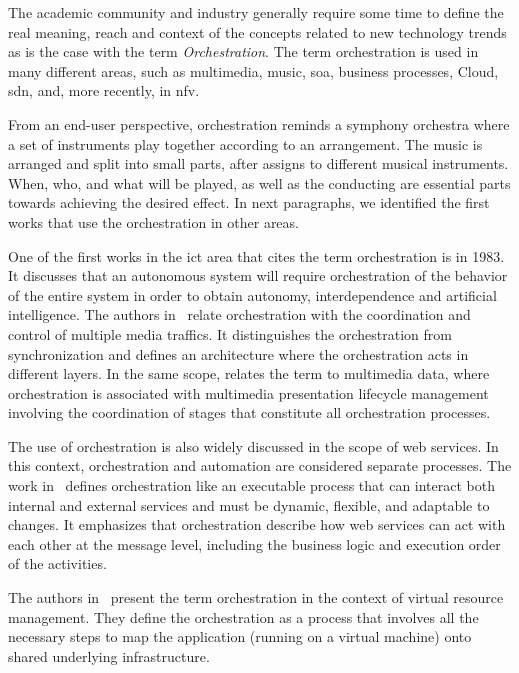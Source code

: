 The academic community and industry generally require some time to define the real meaning, reach and context of the concepts related to new technology trends as is the case with the term \textit{Orchestration}. 
The term orchestration is used in many different areas, such as multimedia, music, \gls{soa}, business processes, Cloud, \gls{sdn}, and, more recently, in \gls{nfv}.

From an end-user perspective, orchestration reminds a symphony orchestra where a set of instruments play together according to an arrangement. The music is arranged and split into small parts, after assigns to different musical instruments. When, who, and what will be played, as well as the conducting are essential parts towards achieving the desired effect. In next paragraphs, we identified the first works that use the orchestration in other areas. 

One of the first works in the \gls{ict} area that cites the term orchestration is \cite{Anderson1983} in 1983. It discusses that an autonomous system will require orchestration of the behavior of the entire system in order to obtain autonomy, interdependence and artificial intelligence. The authors in~\cite{Campbell1992} relate orchestration with the coordination and control of multiple media traffics. It distinguishes the orchestration from synchronization and defines an architecture where the orchestration acts in different layers. In the same scope, \cite{Robbins1997ImplementationArchitecture} relates the term to multimedia data, where orchestration is associated with multimedia presentation lifecycle management involving the coordination of stages that constitute all orchestration processes. 

The use of orchestration is also widely discussed in the scope of web services. In this context, orchestration and automation are considered separate processes. The work in~\cite{Peltz2003WebChoreography} defines orchestration like an executable process that can interact both internal and external services and must be dynamic, flexible, and adaptable to changes. It emphasizes that orchestration describe how web services can act with each other at the message level, including the business logic and execution order of the activities. 

The authors in~\cite{Grit2006} present the term orchestration in the context of virtual resource management. They define the orchestration as a process that involves all the necessary steps to map the application (running on a virtual machine) onto shared underlying infrastructure. 

